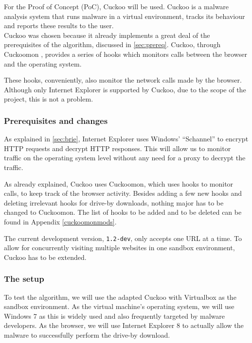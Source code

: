 
For the Proof of Concept (PoC), Cuckoo \cite{cuckoo} will be used. Cuckoo is a malware analysis system that runs malware in a virtual environment, tracks its behaviour and reports these results to the user.\\

Cuckoo was chosen because it already implements a great deal of the prerequisites of the algorithm, discussed in \ref{sec:prereq}. Cuckoo, through Cuckoomon \cite{cuckoomon}, provides a series of hooks which monitors calls between the browser and the operating system.

These hooks, conveniently, also monitor the network calls made by the browser. Although only Internet Explorer is supported by Cuckoo, due to the scope of the project, this is not a problem.

\subsubsection{Prerequisites and changes}

As explained in \ref{sec:brie}, Internet Explorer uses Windows' ``Schannel'' \cite{schannel} to encrypt HTTP requests and decrypt HTTP responses. This will allow us to monitor traffic on the operating system level without any need for a proxy to decrypt the traffic.

As already explained, Cuckoo uses Cuckoomon, which uses hooks to monitor calls, to keep track of the browser activity. Besides adding a few new hooks and deleting irrelevant hooks for drive-by downloads, nothing major has to be changed to Cuckoomon. The list of hooks to be added and to be deleted can be found in Appendix \ref{cuckoomonmods}.

The current development version, \texttt{1.2-dev},  only accepts one URL at a time. To allow for concurrently visiting multiple websites in one sandbox environment, Cuckoo has to be extended.

\subsubsection{The setup}
\label{sec:setup}

To test the algorithm, we will use the adapted Cuckoo with Virtualbox as the sandbox environment. As the virtual machine's operating system, we will use Windows 7 as this is widely used and also frequently targeted by malware developers. As the browser, we will use Internet Explorer 8 to actually allow the malware to successfully perform the drive-by download.

